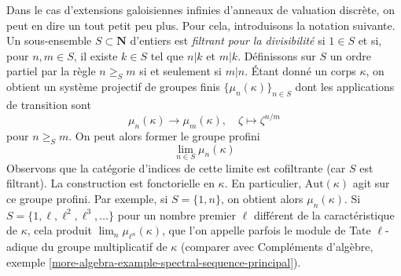 \noindent
Dans le cas d'extensions galoisiennes infinies d'anneaux de valuation discrète,
on peut en dire un tout petit peu plus. Pour cela, introduisons la notation suivante.
Un sous-ensemble $S \subset \mathbf{N}$ d'entiers est {\it filtrant pour la divisibilité}
si $1 \in S$ et si, pour $n, m \in S$, il existe $k \in S$ tel que
$n | k$ et $m | k$. Définissons sur $S$ un ordre partiel par la règle
$n \geq_S m$ si et seulement si $m | n$. Étant donné un corps $\kappa$, on obtient
un système projectif de groupes finis $\{\mu_n(\kappa)\}_{n \in S}$
dont les applications de transition sont
$$
\mu_n(\kappa) \longrightarrow \mu_m(\kappa),\quad
\zeta \longmapsto \zeta^{n/m}
$$
pour $n \geq_S m$. On peut alors former le groupe profini
$$
\lim_{n \in S} \mu_n(\kappa)
$$
Observons que la catégorie d'indices de cette limite est cofiltrante (car $S$ est filtrant).
La construction est fonctorielle en $\kappa$. En particulier,
$\text{Aut}(\kappa)$ agit sur ce groupe profini.
Par exemple, si $S = \{1, n\}$, on obtient alors $\mu_n(\kappa)$.
Si $S = \{1, \ell, \ell^2, \ell^3, \ldots\}$ pour un nombre premier
$\ell$ différent de la caractéristique de $\kappa$, cela produit
$\lim_n \mu_{\ell^n}(\kappa)$,
que l'on appelle parfois le module de Tate $\ell$-adique du groupe
multiplicatif de $\kappa$ (comparer avec
Compléments d'algèbre, exemple
\ref{more-algebra-example-spectral-sequence-principal}).

